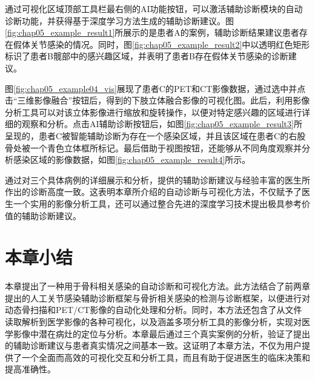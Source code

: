 通过可视化区域顶部工具栏最右侧的AI功能按钮，可以激活辅助诊断模块的自动诊断功能，并获得基于深度学习方法生成的辅助诊断建议。图\ref{fig:chap05_example_result1}所展示的是患者A的案例，辅助诊断结果建议患者存在假体关节感染的情况。同时，图\ref{fig:chap05_example_result2}中以透明红色矩形标识了患者B髋部中的感兴趣区域，并表明了患者B存在假体关节感染的诊断建议。

图\ref{fig:chap05_example04_vis}展现了患者C的PET和CT影像数据，通过选中并点击“三维影像融合”按钮后，得到的下肢立体融合影像的可视化图。此后，利用影像分析工具可以对该立体影像进行缩放和旋转操作，以便对特定感兴趣的区域进行详细的观察和分析。点击AI辅助诊断按钮后，如图\ref{fig:chap05_example_result3}所呈现的，患者C被智能辅助诊断为存在一个感染区域，并且该区域在患者C的右股骨处被一个青色立体框所标记。最后借助于视图按钮，还能够从不同角度观察并分析感染区域的影像数据，如图\ref{fig:chap05_example_result4}所示。

通过对三个具体病例的详细展示和分析，提供的辅助诊断建议与经验丰富的医生所作出的诊断高度一致。这表明本章所介绍的自动诊断与可视化方法，不仅赋予了医生一个实用的影像分析工具，还可以通过整合先进的深度学习技术提出极具参考价值的辅助诊断建议。

\section{本章小结}

本章提出了一种用于骨科相关感染的自动诊断和可视化方法。此方法结合了前两章提出的人工关节感染辅助诊断框架与骨折相关感染的检测与诊断框架，以便进行对动态骨扫描和PET/CT影像的自动化处理和分析。同时，本方法还包含了从文件读取解析到医学影像的各种可视化，以及涵盖多项分析工具的影像分析，实现对医学影像中潜在病灶的定位与分析。本章最后通过三个真实案例的分析，验证了提出的辅助诊断建议与患者真实情况之间基本一致。这证明了本章方法，不仅为用户提供了一个全面而高效的可视化交互和分析工具，而且有助于促进医生的临床决策和提高准确性。